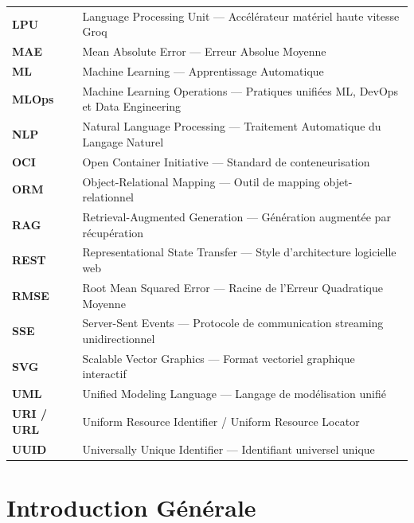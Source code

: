 \documentclass[11pt,a4paper,oneside]{report}
\begin{document}
\begin{center}
\begin{tabularx}{\textwidth}{@{}p{3.2cm}X@{}}
\textbf{LPU} & Language Processing Unit --- Accélérateur matériel haute vitesse Groq \\
\textbf{MAE} & Mean Absolute Error --- Erreur Absolue Moyenne \\
\textbf{ML} & Machine Learning --- Apprentissage Automatique \\
\textbf{MLOps} & Machine Learning Operations --- Pratiques unifiées ML, DevOps et Data Engineering \\
\textbf{NLP} & Natural Language Processing --- Traitement Automatique du Langage Naturel \\
\textbf{OCI} & Open Container Initiative --- Standard de conteneurisation \\
\textbf{ORM} & Object-Relational Mapping --- Outil de mapping objet-relationnel \\
\textbf{RAG} & Retrieval-Augmented Generation --- Génération augmentée par récupération \\
\textbf{REST} & Representational State Transfer --- Style d'architecture logicielle web \\
\textbf{RMSE} & Root Mean Squared Error --- Racine de l'Erreur Quadratique Moyenne \\
\textbf{SSE} & Server-Sent Events --- Protocole de communication streaming unidirectionnel \\
\textbf{SVG} & Scalable Vector Graphics --- Format vectoriel graphique interactif \\
\textbf{UML} & Unified Modeling Language --- Langage de modélisation unifié \\
\textbf{URI / URL} & Uniform Resource Identifier / Uniform Resource Locator \\
\textbf{UUID} & Universally Unique Identifier --- Identifiant universel unique \\ \bottomrule
\end{tabularx}
\end{center}

\newpage
{}

\chapter*{Introduction Générale}
\end{document}
